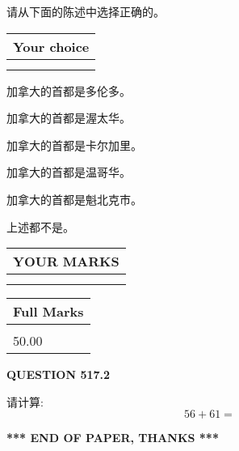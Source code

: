 \documentclass{ctexart}
\begin{document}
  
请从下面的陈述中选择正确的。
  
  
\noindent\hspace{3.0in} \begin{tabular}{|l|}
\hline
Your choice \\
\hline
 \\ 
 \\ 
\hline
\end{tabular}
  
  
 
 
加拿大的首都是多伦多。
 
 
加拿大的首都是渥太华。
 
 
加拿大的首都是卡尔加里。
 
 
加拿大的首都是温哥华。
 
 
加拿大的首都是魁北克市。
 
 
 上述都不是。
 
 
  
\vspace{0.2in}
  
\noindent\begin{tabular}{|l|}
\hline
 YOUR MARKS  \\
\hline
 \\ 
 \\ 
\hline
\end{tabular}
\hspace{0.05in} \begin{tabular}{|l|}
\hline
 Full Marks  \\
\hline
 \\ 
50.00 \\
\hline
\end{tabular}
{\textbf{\Large{QUESTION
517.2 
}}}
  
  
 
请计算:
\begin{equation}
56 +  %
61 = \nonumber
\end{equation}
 

 

 
   
   
 \vspace{0.2in}
 
   
   
   
   
\vspace{1.0in} 
{\textbf{\large{ *** END OF PAPER, THANKS *** }}} 
   
\end{document}
